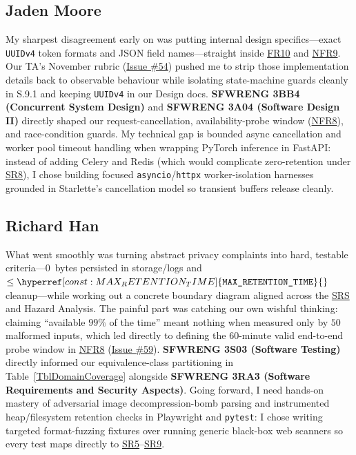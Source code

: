 \documentclass[11pt]{article}
\newcommand{\MaxRetentionTime}{\hyperref[const:MAX_RETENTION_TIME]{\texttt{MAX\_\allowbreak{}RETENTION\_\allowbreak{}TIME}}}
\newcommand{\SRS}{\hyperlink{acr-srs}{SRS}}
\begin{document}
\subsection*{Jaden Moore}
My sharpest disagreement early on was putting internal design specifics---exact \texttt{UUIDv4} token formats and JSON field names---straight inside \hyperref[FR10]{FR10} and \hyperref[NFR9]{NFR9}. Our TA's November rubric (\href{https://github.com/richy1337/Verity/issues/54}{Issue \#54}) pushed me to strip those implementation details back to observable behaviour while isolating state-machine guards cleanly in S.9.1 and keeping \texttt{UUIDv4} in our Design docs. \textbf{SFWRENG 3BB4 (Concurrent System Design)} and \textbf{SFWRENG 3A04 (Software Design II)} directly shaped our request-cancellation, availability-probe window (\hyperref[NFR8]{NFR8}), and race-condition guards. My technical gap is bounded async cancellation and worker pool timeout handling when wrapping PyTorch inference in FastAPI: instead of adding Celery and Redis (which would complicate zero-retention under \hyperref[SR8]{SR8}), I chose building focused \texttt{asyncio}/\texttt{httpx} worker-isolation harnesses grounded in Starlette's cancellation model so transient buffers release cleanly.

\subsection*{Richard Han}
What went smoothly was turning abstract privacy complaints into hard, testable criteria---0~bytes persisted in storage/logs and $\le \MaxRetentionTime{}$ cleanup---while working out a concrete boundary diagram aligned across the \SRS{} and Hazard Analysis. The painful part was catching our own wishful thinking: claiming ``available $99\%$ of the time'' meant nothing when measured only by $50$ malformed inputs, which led directly to defining the $60$-minute valid end-to-end probe window in \hyperref[NFR8]{NFR8} (\href{https://github.com/richy1337/Verity/issues/59}{Issue \#59}). \textbf{SFWRENG 3S03 (Software Testing)} directly informed our equivalence-class partitioning in Table~\ref{TblDomainCoverage} alongside \textbf{SFWRENG 3RA3 (Software Requirements and Security Aspects)}. Going forward, I need hands-on mastery of adversarial image decompression-bomb parsing and instrumented heap/filesystem retention checks in Playwright and \texttt{pytest}: I chose writing targeted format-fuzzing fixtures over running generic black-box web scanners so every test maps directly to \hyperref[SR5]{SR5}--\hyperref[SR9]{SR9}.
\end{document}
